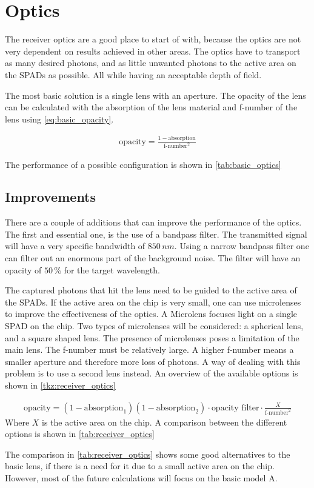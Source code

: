 \section{Optics}\label{ssec:optics}
The receiver optics are a good place to start of with, because the optics are not very dependent on results achieved in other areas. The optics have to transport as many desired photons, and as little unwanted photons to the active area on the SPADs as possible. All while having an acceptable depth of field. 

The most basic solution is a single lens with an aperture. The opacity of the lens can be calculated with the absorption of the lens material and f-number of the lens using \cref{eq:basic_opacity}.

\begin{align}\label{eq:basic_opacity}
\text{opacity} = \frac{1-\text{absorption}}{\text{f-number}^2}
\end{align}

 The performance of a possible configuration is shown in \cref{tab:basic_optics}



\subsection{Improvements}
There are a couple of additions that can improve the performance of the optics. The first and essential one, is the use of a bandpass filter. The transmitted signal will have a very specific bandwidth of $850\,nm$. Using a narrow bandpass filter one can filter out an enormous part of the background noise. The filter will have an opacity of $50\,\%$ for the target wavelength.

The captured photons that hit the lens need to be guided to the active area of the SPADs. If the active area on the chip is very small, one can use microlenses to improve the effectiveness of the optics. A Microlens focuses light on a single SPAD on the chip. Two types of microlenses will be considered: a spherical lens, and a square shaped lens. The presence of microlenses poses a limitation of the main lens. The f-number must be relatively large. A higher f-number means a smaller aperture and therefore more loss of photons. A way of dealing with this problem is to use a second lens instead. An overview of the available options is shown in \cref{tkz:receiver_optics}



\begin{align}
\text{opacity} = (1-\text{absorption}_1)(1-\text{absorption}_2)\cdot\text{opacity filter}\cdot \frac{X}{\text{f-number}^2}
\end{align}
Where $X$ is the active area on the chip. A comparison between the different options is shown in \cref{tab:receiver_optics}



The comparison in \cref{tab:receiver_optics} shows some good alternatives to the basic lens, if there is a need for it due to a small active area on the chip. However, most of the future calculations will focus on the basic model A.

